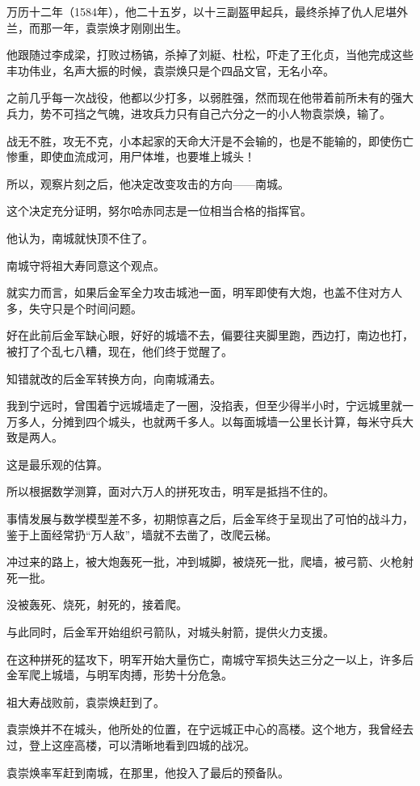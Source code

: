 \begin{multicols}{\theparacolNo}
		万历十二年（1584年），他二十五岁，以十三副盔甲起兵，最终杀掉了仇人尼堪外兰，而那一年，袁崇焕才刚刚出生。

		他跟随过李成梁，打败过杨镐，杀掉了刘綎、杜松，吓走了王化贞，当他完成这些丰功伟业，名声大振的时候，袁崇焕只是个四品文官，无名小卒。

		之前几乎每一次战役，他都以少打多，以弱胜强，然而现在他带着前所未有的强大兵力，势不可挡之气魄，进攻兵力只有自己六分之一的小人物袁崇焕，输了。

		战无不胜，攻无不克，小本起家的天命大汗是不会输的，也是不能输的，即使伤亡惨重，即使血流成河，用尸体堆，也要堆上城头！

		所以，观察片刻之后，他决定改变攻击的方向——南城。

		这个决定充分证明，努尔哈赤同志是一位相当合格的指挥官。

		他认为，南城就快顶不住了。

		南城守将祖大寿同意这个观点。

		就实力而言，如果后金军全力攻击城池一面，明军即使有大炮，也盖不住对方人多，失守只是个时间问题。

		好在此前后金军缺心眼，好好的城墙不去，偏要往夹脚里跑，西边打，南边也打，被打了个乱七八糟，现在，他们终于觉醒了。

		知错就改的后金军转换方向，向南城涌去。

		我到宁远时，曾围着宁远城墙走了一圈，没掐表，但至少得半小时，宁远城里就一万多人，分摊到四个城头，也就两千多人。以每面城墙一公里长计算，每米守兵大致是两人。

		这是最乐观的估算。

		所以根据数学测算，面对六万人的拼死攻击，明军是抵挡不住的。

		事情发展与数学模型差不多，初期惊喜之后，后金军终于呈现出了可怕的战斗力，鉴于上面经常扔“万人敌”，墙就不去凿了，改爬云梯。

		冲过来的路上，被大炮轰死一批，冲到城脚，被烧死一批，爬墙，被弓箭、火枪射死一批。

		没被轰死、烧死，射死的，接着爬。

		与此同时，后金军开始组织弓箭队，对城头射箭，提供火力支援。

		在这种拼死的猛攻下，明军开始大量伤亡，南城守军损失达三分之一以上，许多后金军爬上城墙，与明军肉搏，形势十分危急。

		祖大寿战败前，袁崇焕赶到了。

		袁崇焕并不在城头，他所处的位置，在宁远城正中心的高楼。这个地方，我曾经去过，登上这座高楼，可以清晰地看到四城的战况。

		袁崇焕率军赶到南城，在那里，他投入了最后的预备队。


\end{multicols}
